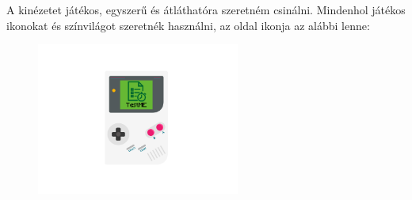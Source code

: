 









A kinézetet játékos, egyszerű és átláthatóra szeretném csinálni.
Mindenhol játékos ikonokat és színvilágot szeretnék használni, az oldal ikonja az alábbi lenne:

\begin{figure}[h]
    \centering
    \includegraphics[height=5cm]{images/gameboy.png}
\end{figure}



